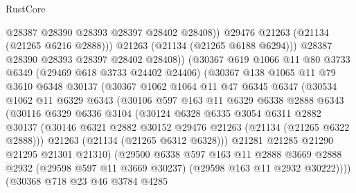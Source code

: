 \begin{lexlean}{RustCore}
\begin{coremodule}
                        @28387
                        @28390
                        @28393
                        @28397
                        @28402
                        @28408))
                    @29476
                    @21263
                    (@21134 (@21265 @6216 @2888)))
                  @21263
                  (@21134 (@21265 @6188 @6294)))
                @28387
                @28390
                @28393
                @28397
                @28402
                @28408))
            (@30367
              @619
              @1066
              @11
              @80
              @3733
              @6349
              (@29469 @618 @3733 @24402 @24406)
              (@30367
                @138
                @1065
                @11
                @79
                @3610
                @6348
                @30137
                (@30367
                  @1062
                  @1064
                  @11
                  @47
                  @6345
                  @6347
                  (@30534
                    @1062
                    @11
                    @6329
                    @6343
                    (@30106
                      @597
                      @163
                      @11
                      @6329
                      @6338
                      @2888
                      @6343
                      (@30116
                        @6329
                        @6336
                        @3104
                        (@30124
                          @6328
                          @6335
                          @3054
                          @6311
                          @2882
                          @30137
                          (@30146 @6321 @2882 @30152 @29476 @21263 (@21134 (@21265 @6322 @2888)))
                          @21263
                          (@21134 (@21265 @6312 @6328)))
                        @21281
                        @21285
                        @21290
                        @21295
                        @21301
                        @21310)
                      (@29500
                        @6338
                        @597
                        @163
                        @11
                        @2888
                        @3669
                        @2888
                        @2932
                        (@29598 @597 @11 @3669 @30237)
                        (@29598 @163 @11 @2932 @30222))))
                  (@30368
                    @718
                    @23
                    @46
                    @3784
                    @4285

\end{coremodule}
\end{lexlean}
